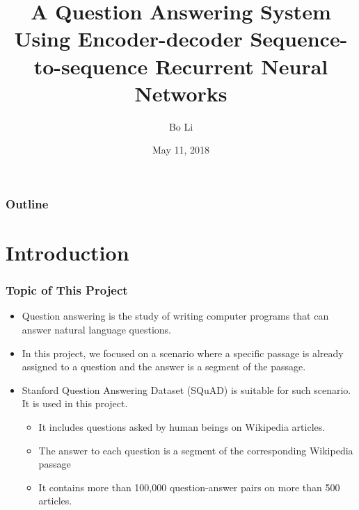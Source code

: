 \documentclass{beamer}
\begin{document}
\raggedright

\title{A Question Answering System Using Encoder-decoder Sequence-to-sequence Recurrent Neural Networks}
\author{Bo Li}
\date{May 11, 2018}

\begin{frame}
\titlepage

\end{frame}

\begin{frame}

  \frametitle{Outline}

  \tableofcontents[hideallsubsections]

\end{frame}



\section{Introduction}

\begin{frame} \frametitle{Topic of This Project}
    \begin{itemize}
        \item Question answering is the study of writing computer programs that can answer natural language questions.
        \item In this project, we focused on a scenario where a specific passage is already assigned to a question and the answer is a segment of the passage.
        \item Stanford Question Answering Dataset (SQuAD) is suitable for such scenario. It is used in this project.
        \begin{itemize}
            \item It includes questions asked by human beings on Wikipedia articles.
            \item The answer to each question is a segment of the corresponding Wikipedia passage
            \item It contains more than 100,000 question-answer pairs on more than 500 articles.
        \end{itemize}


    \end{itemize}
\end{frame}
\end{document}
